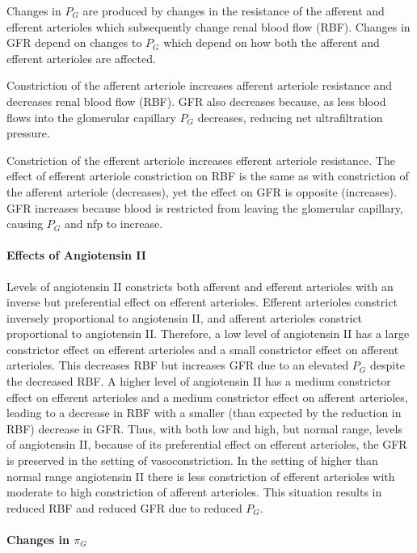 Changes in $P_{G}$ are produced by changes in the resistance of the afferent and efferent arterioles which subsequently change renal blood flow (RBF). Changes in GFR depend on changes to $P_{G}$ which depend on how both the afferent and efferent arterioles are affected.

Constriction of the afferent arteriole increases afferent arteriole resistance and decreases renal blood flow (RBF). GFR also decreases because, as less blood flows into the glomerular capillary $P_{G}$ decreases, reducing net ultrafiltration pressure.

Constriction of the efferent arteriole increases efferent arteriole resistance. The effect of efferent arteriole constriction on RBF is the same as with constriction of the afferent arteriole (decreases), yet the effect on GFR is opposite (increases). GFR increases because blood is restricted from leaving the glomerular capillary, causing $P_{G}$ and nfp to increase.

\paragraph{Effects of Angiotensin II}

Levels of angiotensin II constricts both afferent and efferent arterioles with an inverse but preferential effect on efferent arterioles. Efferent arterioles constrict inversely proportional to angiotensin II, and afferent arterioles constrict proportional to angiotensin II. Therefore, a low level of angiotensin II has a large constrictor effect on efferent arterioles and a small constrictor effect on afferent arterioles. This decreases RBF but increases GFR due to an elevated $P_G$ despite the decreased RBF. A higher level of angiotensin II has a medium constrictor effect on efferent arterioles and a medium constrictor effect on afferent arterioles, leading to a decrease in RBF with a smaller (than expected by the reduction in RBF) decrease in GFR. Thus, with both low and high, but normal range, levels of angiotensin II, because of its preferential effect on efferent arterioles, the GFR is preserved in the setting of vasoconstriction. In the setting of higher than normal range angiotensin II there is less constriction of efferent arterioles with moderate to high constriction of afferent arterioles. This situation results in reduced RBF and reduced GFR due to reduced  $P_{G}$.

\paragraph{Changes in $\pi_{G}$}

